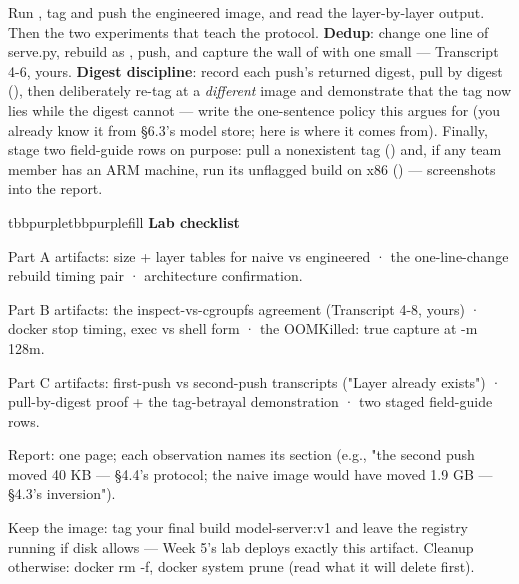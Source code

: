 Run , tag and push the engineered image, and read the layer-by-layer output. Then the two experiments that teach the protocol. \textbf{Dedup}: change one line of serve.py, rebuild as , push, and capture the wall of  with one small  — Transcript 4-6, yours. \textbf{Digest discipline}: record each push's returned digest, pull by digest (), then deliberately re-tag  at a \textit{different} image and demonstrate that the tag now lies while the digest cannot — write the one-sentence policy this argues for (you already know it from §6.3's model store; here is where it comes from). Finally, stage two field-guide rows on purpose: pull a nonexistent tag () and, if any team member has an ARM machine, run its unflagged build on x86 () — screenshots into the report.

\begin{calloutbox}{tbbpurple}{tbbpurplefill}
{\normalsize\bfseries\color{tbbpurple}Lab checklist}\par\vspace{3pt}
\begin{tbbitemize}
  \item Part A artifacts: size + layer tables for naive vs engineered · the one-line-change rebuild timing pair · architecture confirmation.
  \item Part B artifacts: the inspect-vs-cgroupfs agreement (Transcript 4-8, yours) · docker stop timing, exec vs shell form · the OOMKilled: true capture at -m 128m.
  \item Part C artifacts: first-push vs second-push transcripts ("Layer already exists") · pull-by-digest proof + the tag-betrayal demonstration · two staged field-guide rows.
  \item Report: one page; each observation names its section (e.g., "the second push moved 40 KB — §4.4's protocol; the naive image would have moved 1.9 GB — §4.3's inversion").
  \item Keep the image: tag your final build model-server:v1 and leave the registry running if disk allows — Week 5's lab deploys exactly this artifact. Cleanup otherwise: docker rm -f, docker system prune (read what it will delete first).
\end{tbbitemize}
\end{calloutbox}

